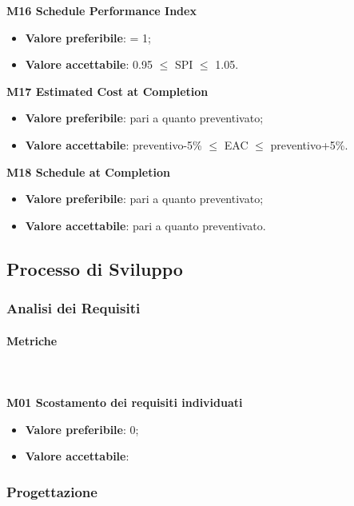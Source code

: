 				\textbf{M16 Schedule Performance Index}
				\begin{itemize}
					\item \textbf{Valore preferibile}: = 1;
					\item \textbf{Valore accettabile}: 0.95 $\le$ SPI $\le$ 1.05.
				\end{itemize}
				\textbf{M17 Estimated Cost at Completion}
				\begin{itemize}
					\item \textbf{Valore preferibile}: pari a quanto preventivato;
					\item \textbf{Valore accettabile}: preventivo-5\% $\le$ EAC $\le$ preventivo+5\%.
				\end{itemize}
				\textbf{M18 Schedule at Completion}
				\begin{itemize}
					\item \textbf{Valore preferibile}: pari a quanto preventivato;
					\item \textbf{Valore accettabile}: pari a quanto preventivato.
				\end{itemize}
				
											
	\subsection{Processo di Sviluppo}
		\subsubsection{Analisi dei Requisiti} 
			\paragraph{Metriche} \mbox{} \\ \\
				\textbf{M01 Scostamento dei requisiti individuati} 
				\begin{itemize}
					\item \textbf{Valore preferibile}: 0;
					\item \textbf{Valore accettabile}: 
				\end{itemize}
		\subsubsection{Progettazione} 
